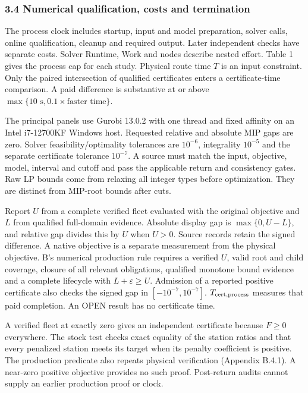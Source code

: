 \documentclass[
  american,
  11pt,
]{article}
\begin{document}
\subsubsection{3.4 Numerical qualification, costs and
termination}\label{numerical-qualification-costs-and-termination}

The process clock includes startup, input and model preparation, solver
calls, online qualification, cleanup and required output. Later
independent checks have separate costs. Solver Runtime, Work and nodes
describe nested effort. Table 1 gives the process cap for each study.
Physical route time \(T\) is an input constraint. Only the paired
intersection of qualified certificates enters a certificate-time
comparison. A paid difference is substantive at or above
\(\max\{10\text{ s},0.1\times\text{faster time}\}\).

The principal panels use Gurobi 13.0.2 with one thread and fixed
affinity on an Intel i7-12700KF Windows host. Requested relative and
absolute MIP gaps are zero. Solver feasibility/optimality tolerances are
\(10^{-6}\), integrality \(10^{-5}\) and the separate certificate
tolerance \(10^{-7}\). A source must match the input, objective, model,
interval and cutoff and pass the applicable return and consistency
gates. Raw LP bounds come from relaxing all integer types before
optimization. They are distinct from MIP-root bounds after cuts.

Report \(U\) from a complete verified fleet evaluated with the original
objective and \(L\) from qualified full-domain evidence. Absolute
display gap is \(\max\{0,U-L\}\), and relative gap divides this by \(U\)
when \(U>0\). Source records retain the signed difference. A native
objective is a separate measurement from the physical objective. B's
numerical production rule requires a verified \(U\), valid root and
child coverage, closure of all relevant obligations, qualified monotone
bound evidence and a complete lifecycle with \(L+\varepsilon\ge U\).
Admission of a reported positive certificate also checks the signed gap
in \([-10^{-7},10^{-7}]\). \(T_{\rm cert,process}\) measures that paid
completion. An OPEN result has no certificate time.

A verified fleet at exactly zero gives an independent certificate
because \(F\ge0\) everywhere. The stock test checks exact equality of
the station ratios and that every penalized station meets its target
when its penalty coefficient is positive. The production predicate also
repeats physical verification (Appendix B.4.1). A near-zero positive
objective provides no such proof. Post-return audits cannot supply an
earlier production proof or clock.
\end{document}
